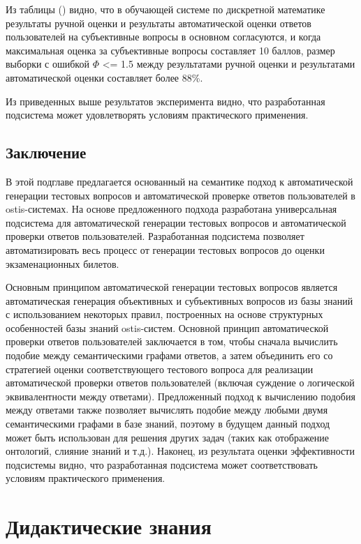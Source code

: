 Из таблицы (\textit{}) видно, что в обучающей системе по дискретной математике результаты ручной оценки и результаты автоматической оценки ответов пользователей на субъективные вопросы в основном согласуются, и когда максимальная оценка за субъективные вопросы составляет 10 баллов, размер выборки с ошибкой $\Phi$ <= 1.5 между результатами ручной оценки и результатами автоматической оценки составляет более 88\%.

Из приведенных выше результатов эксперимента видно, что разработанная подсистема может удовлетворять условиям практического применения.

\subsection{Заключение}

В этой подглаве предлагается основанный на семантике подход к автоматической генерации тестовых вопросов и автоматической проверке ответов пользователей в ostis-системах. На основе предложенного подхода разработана универсальная подсистема для автоматической генерации тестовых вопросов и автоматической проверки ответов пользователей. Разработанная подсистема позволяет автоматизировать весь процесс от генерации тестовых вопросов до оценки экзаменационных билетов.

Основным принципом автоматической генерации тестовых вопросов является автоматическая генерация объективных и субъективных вопросов из базы знаний с использованием некоторых правил, построенных на основе структурных особенностей базы знаний ostis-систем. Основной принцип автоматической проверки ответов пользователей заключается в том, чтобы сначала вычислить подобие между семантическими графами ответов, а затем объединить его со стратегией оценки соответствующего тестового вопроса для реализации автоматической проверки ответов пользователей (включая суждение о логической эквивалентности между ответами). Предложенный подход к вычислению подобия между ответами также позволяет вычислять подобие между любыми двумя семантическими графами в базе знаний, поэтому в будущем данный подход может быть использован для решения других задач (таких как отображение онтологий, слияние знаний и т.д.). Наконец, из результата оценки эффективности подсистемы видно, что разработанная подсистема может соответствовать условиям практического применения.


\section{Дидактические знания}
\label{section_knowledge_control}

%